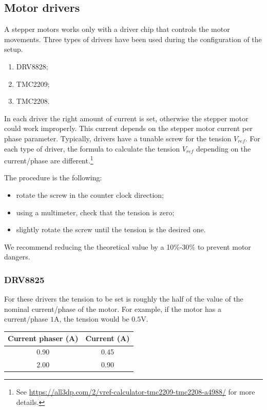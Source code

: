 \documentclass{article}
\begin{document}
\begin{multicols}{2}
        \subsection{Motor drivers}
        A stepper motors works only with a driver chip that controls the motor movements.
        Three types of drivers have been used during the configuration of the setup.
        \begin{enumerate}
            \item DRV8828;
            \item TMC2209;
            \item TMC2208.
        \end{enumerate}
        
        In each driver the right amount of current is set, otherwise the stepper motor could work improperly.
        This current depends on the stepper motor current per phase parameter.
        Typically, drivers have a tunable screw for the tension \(V_{ref}\).
        For each type of driver, the formula to calculate the tension \(V_{ref}\) depending on the current/phase are different.\footnote{See \url{https://all3dp.com/2/vref-calculator-tmc2209-tmc2208-a4988/} for more details.}

        The procedure is the following:
        \begin{itemize}
            \item rotate the screw in the counter clock direction;
            \item using a multimeter, check that the tension is zero;
            \item slightly rotate the screw until the tension is the desired one.
        \end{itemize}
        We recommend reducing the theoretical value by a 10\%-30\% to prevent motor dangers.

        \subsubsection{DRV8825}
        For these drivers the tension to be set is roughly the half of the value of the nominal current/phase of the motor.
        For example, if the motor has a current/phase \(1\)A, the tension would be \(0.5\)V.

        \begin{minipage}
            {.4\textwidth}
            \begin{tabular}{cc}
                Current phaser (A) & Current (A) \\
                \hline
                0.90 & 0.45 \\
                2.00 & 0.90             
            \end{tabular}
            \label{tab:drivers_curr}
        \end{minipage} 


\end{multicols}
\end{document}
